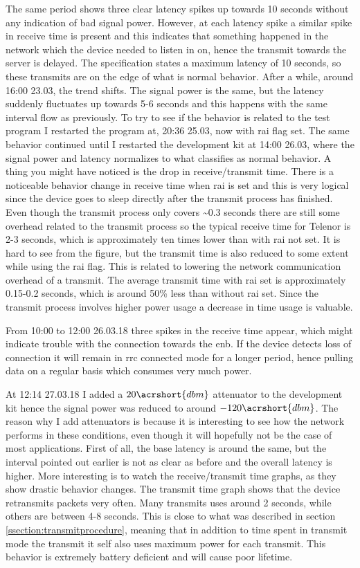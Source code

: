 \documentclass[USenglish]{ifimaster}  %
\begin{document}
The same period shows three clear latency spikes up towards 10 seconds without any indication of bad signal power. However, at each latency spike a similar spike in receive time is present and this indicates that something happened in the network which the device needed to listen in on, hence the transmit towards the server is delayed. The specification states a maximum latency of 10 seconds, so these transmits are on the edge of what is normal behavior. After a while, around 16:00 23.03, the trend shifts. The signal power is the same, but the latency suddenly fluctuates up towards 5-6 seconds and this happens with the same interval flow as previously. To try to see if the behavior is related to the test program I restarted the program at, 20:36 25.03, now with \acrshort{rai} flag set. The same behavior continued until I restarted the development kit at 14:00 26.03, where the signal power and latency normalizes to what classifies as normal behavior. A thing you might have noticed is the drop in receive/transmit time. There is a noticeable behavior change in receive time when \acrshort{rai} is set and this is very logical since the device goes to sleep directly after the transmit process has finished. Even though the transmit process only covers \textasciitilde0.3 seconds there are still some overhead related to the transmit process so the typical receive time for Telenor is 2-3 seconds, which is approximately ten times lower than with \acrshort{rai} not set. It is hard to see from the figure, but the transmit time is also reduced to some extent while using the \acrshort{rai} flag. This is related to lowering the network communication overhead of a transmit. The average transmit time with \acrshort{rai} set is approximately 0.15-0.2 seconds, which is around 50\% less than without \acrshort{rai} set. Since the transmit process involves higher power usage a decrease in time usage is valuable.

From 10:00 to 12:00 26.03.18 three spikes in the receive time appear, which might indicate trouble with the connection towards the \acrshort{enb}. If the device detects loss of connection it will remain in \acrshort{rrc} connected mode for a longer period, hence pulling data on a regular basis which consumes very much power.

At 12:14 27.03.18 I added a ${20 \acrshort{dbm}}$ attenuator to the development kit hence the signal power was reduced to around ${-120 \acrshort{dbm}}$. The reason why I add attenuators is because it is interesting to see how the network performs in these conditions, even though it will hopefully not be the case of most applications. First of all, the base latency is around the same, but the interval pointed out earlier is not as clear as before and the overall latency is higher. More interesting is to watch the receive/transmit time graphs, as they show drastic behavior changes. The transmit time graph shows that the device retransmits packets very often. Many transmits uses around 2 seconds, while others are between 4-8 seconds. This is close to what was described in section \vref{ssection:transmitprocedure}, meaning that in addition to time spent in transmit mode the transmit it self also uses maximum power for each transmit. This behavior is extremely battery deficient and will cause poor lifetime.
\end{document}
